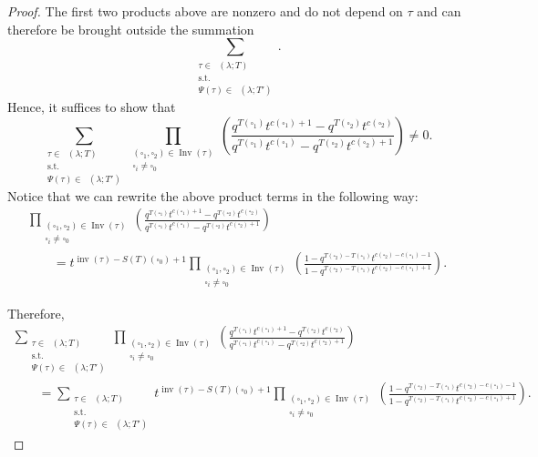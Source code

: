 \documentclass[pdftex]{sigma}
\numberwithin{equation}{section}
\theoremstyle{definition}
\DeclareMathOperator{\PSYT}{\mathrm{PSYT}_{\geq 0}}
\DeclareMathOperator{\Inv}{\mathrm{Inv}}
\DeclareMathOperator{\inv}{inv}
\begin{document}
\begin{proof}
The first two products above are nonzero and do not depend on $\tau$ and can therefore be brought outside the summation
\[
 \sum_{\substack{\tau \in \PSYT(\lambda;T) \\ \text{s.t.}\\ \Psi(\tau) \in \PSYT(\lambda;T')}}.
\]
Hence, it suffices to show that
\[
\sum_{\substack{\tau \in \PSYT(\lambda;T) \\ \text{s.t.}\\ \Psi(\tau) \in \PSYT(\lambda;T')}} \prod_{\substack{(\square_1,\square_2) \in \Inv(\tau)\\ \square_i \neq \square_0}} \left( \frac{q^{T(\square_1)}t^{c(\square_1)+1} - q^{T(\square_2)}t^{c(\square_2)}}{q^{T(\square_1)}t^{c(\square_1)} - q^{T(\square_2)}t^{c(\square_2)+1}} \right) \neq 0.
\]
Notice that we can rewrite the above product terms in the following way:
\begin{gather*}
 \prod_{\substack{(\square_1,\square_2) \in \Inv(\tau)\\ \square_i \neq \square_0}} \left( \frac{q^{T(\square_1)}t^{c(\square_1)+1} - q^{T(\square_2)}t^{c(\square_2)}}{q^{T(\square_1)}t^{c(\square_1)} - q^{T(\square_2)}t^{c(\square_2)+1}} \right) \\
 \qquad = t^{\inv(\tau) -S(T)(\square_0)+1} \prod_{\substack{(\square_1,\square_2) \in \Inv(\tau)\\ \square_i \neq \square_0}} \left( \frac{1 - q^{T(\square_2)-T(\square_1)}t^{c(\square_2)-c(\square_1)-1}}{1 - q^{T(\square_2)-T(\square_1)}t^{c(\square_2)-c(\square_1)+1}} \right) .
\end{gather*}

Therefore,
\begin{gather*}
\sum_{\substack{\tau \in \PSYT(\lambda;T) \\ \text{s.t.}\\ \Psi(\tau) \in \PSYT(\lambda;T')}} \prod_{\substack{(\square_1,\square_2) \in \Inv(\tau)\\ \square_i \neq \square_0}} \left( \frac{q^{T(\square_1)}t^{c(\square_1)+1} - q^{T(\square_2)}t^{c(\square_2)}}{q^{T(\square_1)}t^{c(\square_1)} - q^{T(\square_2)}t^{c(\square_2)+1}} \right) \\
\qquad= \sum_{\substack{\tau \in \PSYT(\lambda;T) \\ \text{s.t.}\\ \Psi(\tau) \in \PSYT(\lambda;T')}} t^{\inv(\tau) -S(T)(\square_0)+1} \prod_{\substack{(\square_1,\square_2) \in \Inv(\tau)\\ \square_i \neq \square_0}} \left( \frac{1 - q^{T(\square_2)-T(\square_1)}t^{c(\square_2)-c(\square_1)-1}}{1 - q^{T(\square_2)-T(\square_1)}t^{c(\square_2)-c(\square_1)+1}} \right) .
\end{gather*}


\end{proof}
\end{document}
